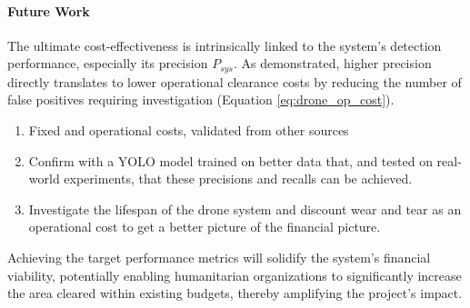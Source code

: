 \paragraph{Future Work} The ultimate cost-effectiveness is intrinsically linked to the system's detection performance, especially its precision $P_{sys}$. As demonstrated, higher precision directly translates to lower operational clearance costs by reducing the number of false positives requiring investigation (Equation \ref{eq:drone_op_cost}). 
\begin{enumerate}
    \item Fixed and operational costs, validated from other sources
    \item Confirm with a YOLO model trained on better data that, and tested on real-world experiments, that these precisions and recalls can be achieved. 
    \item Investigate the lifespan of the drone system and discount wear and tear as an operational cost to get a better picture of the financial picture.
\end{enumerate}

Achieving the target performance metrics will solidify the system's financial viability, potentially enabling humanitarian organizations to significantly increase the area cleared within existing budgets, thereby amplifying the project's impact.